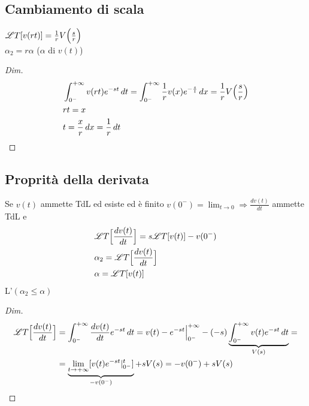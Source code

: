 \subsection{Cambiamento di scala}

$\mathscr{L}T[v(rt)] = \frac{1}{r}V\Bigl(\frac{s}{r}\Bigr)$\\
$\alpha_2 = r\alpha$ ($\alpha$ \AdC di $v(t)$)

\begin{proof}[Dim]
   \[
      \begin{split}
         &\intZeroInfinity v(rt)e^{-st}\,dt = \intZeroInfinity \frac{1}{r}v(x)e^{-\frac{s}{t}}\,dx = \frac{1}{r}V\Bigl(\frac{s}{r}\Bigr)\\
         & rt = x\\
         & t = \frac{x}{r}\,dx = \frac{1}{r}\,dt %
      \end{split}
   \]
\end{proof}
\subsection{Proprità della derivata}
Se $v(t)$ ammette TdL ed esiste ed è finito $v(0^-) = \lim_{t\to 0} \Rightarrow \frac{dv(t)}{dt}$ ammette TdL e
\[
   \begin{split}
      & \mathscr{L}T\Bigl[\frac{dv(t)}{dt}\Bigr] = s\mathscr{L}T[v(t)] - v(0^-)\\
      & \alpha_2 = \mathscr{L}T\Bigl[\frac{dv(t)}{dt}\Bigr]\\
      & \alpha = \mathscr{L}T[v(t)]
   \end{split}
\]
L'\AdC $(\alpha_2 \le \alpha)$

\begin{proof}[Dim]
   \[
      \begin{split}
         \mathscr{L}T\Bigl[\frac{dv(t)}{dt}\Bigr] & = \int_{0^-}^{+\infty} \frac{dv(t)}{dt}e^{-st}\,dt = v(t) - e^{-st}\Big|_{0^-}^{+\infty} - (-s)\underbrace{\int_{0^-}^{+\infty} v(t)e^{-st}\,dt}_{V(s)} =\\
         & = \underbrace{\lim_{t\to +\infty}[v(t)e^{-st}|_{0^-}^{t}]}_{-v(0^-)} + sV(s) = -v(0^-) + sV(s)\\
      \end{split}
   \]
\end{proof}
